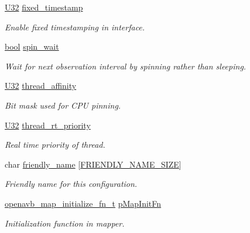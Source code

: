 \begin{DoxyCompactItemize}
\hyperlink{openavb__types__base__pub_8h_a696390429f2f3b644bde8d0322a24124}{U32} \hyperlink{structopenavb__tl__cfg__t_a441ba8abc0d757aaefdb2680e09f19ac}{fixed\+\_\+timestamp}
\begin{DoxyCompactList}\small\item\em Enable fixed timestamping in interface. \end{DoxyCompactList}\item 
\hyperlink{avb__gptp_8h_af6a258d8f3ee5206d682d799316314b1}{bool} \hyperlink{structopenavb__tl__cfg__t_a5e39677fff9263d5891c77729b718142}{spin\+\_\+wait}
\begin{DoxyCompactList}\small\item\em Wait for next observation interval by spinning rather than sleeping. \end{DoxyCompactList}\item 
\hyperlink{openavb__types__base__pub_8h_a696390429f2f3b644bde8d0322a24124}{U32} \hyperlink{structopenavb__tl__cfg__t_a1e5d04c7780ba1521971899952932c78}{thread\+\_\+affinity}
\begin{DoxyCompactList}\small\item\em Bit mask used for C\+PU pinning. \end{DoxyCompactList}\item 
\hyperlink{openavb__types__base__pub_8h_a696390429f2f3b644bde8d0322a24124}{U32} \hyperlink{structopenavb__tl__cfg__t_a55a9e2a7773c0ac79fecc40b5623a9b8}{thread\+\_\+rt\+\_\+priority}
\begin{DoxyCompactList}\small\item\em Real time priority of thread. \end{DoxyCompactList}\item 
char \hyperlink{structopenavb__tl__cfg__t_a0cd8a3733a3e1a077982c80482e5aeb5}{friendly\+\_\+name} \mbox{[}\hyperlink{tl_2openavb__tl__pub_8h_a29d83e67ee30c78c6ed81c188a433c10}{F\+R\+I\+E\+N\+D\+L\+Y\+\_\+\+N\+A\+M\+E\+\_\+\+S\+I\+ZE}\mbox{]}
\begin{DoxyCompactList}\small\item\em Friendly name for this configuration. \end{DoxyCompactList}\item 
\hyperlink{include_2openavb__map__pub_8h_a5572b65a2720331f7ee4de1f7327a441}{openavb\+\_\+map\+\_\+initialize\+\_\+fn\+\_\+t} \hyperlink{structopenavb__tl__cfg__t_a87d7ea4a63a493fb0c5ca7f8a1494a94}{p\+Map\+Init\+Fn}
\begin{DoxyCompactList}\small\item\em Initialization function in mapper. \end{DoxyCompactList}\item 

\end{DoxyCompactItemize}
